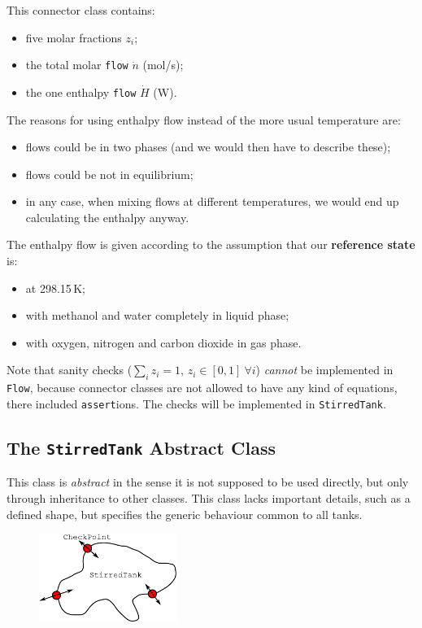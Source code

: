 \documentclass[a4paper]{article}
\begin{document}
This connector class contains:
\begin{itemize}
\item five molar fractions $z_i$;
\item the total molar \texttt{flow} $\dot n$ (mol/s);
\item the one enthalpy \texttt{flow} $\dot H$ (W).
\end{itemize}
The reasons for using enthalpy flow instead of the more usual temperature are:
\begin{itemize}
\item flows could be in two phases (and we would then have to describe these);
\item flows could be not in equilibrium;
\item in any case, when mixing flows at different temperatures, we would end up
calculating the enthalpy anyway.
\end{itemize}
The enthalpy flow is given according to the assumption that our
\textbf{reference state} is:
\begin{itemize}
\item at 298.15\,K;
\item with methanol and water completely in liquid phase;
\item with oxygen, nitrogen and carbon dioxide in gas phase.
\end{itemize}

Note that sanity checks ($\sum_i z_i = 1$, $z_i \in [0,1] ~ \forall i$)
\emph{cannot} be implemented in \texttt{Flow}, because connector classes
are not allowed to have any kind of equations, there included
\texttt{assert}ions. The checks will be implemented in \texttt{StirredTank}.

\subsection{The \texttt{StirredTank} Abstract Class}
This class is \emph{abstract} in the sense it is not supposed to be used
directly, but only through inheritance to other classes. This class lacks
important details, such as a defined shape, but specifies the generic behaviour
common to all tanks.

\begin{figure}[h]
\centering
\includegraphics[width=0.4\textwidth]{pics/stirredtank}
\end{figure}
\end{document}
